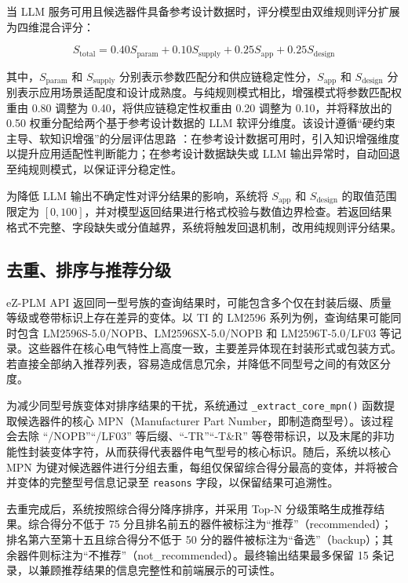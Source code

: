 当 LLM 服务可用且候选器件具备参考设计数据时，评分模型由双维规则评分扩展为四维混合评分：

\begin{equation}
S_{\text{total}} = 0.40 S_{\text{param}} + 0.10 S_{\text{supply}} + 0.25 S_{\text{app}} + 0.25 S_{\text{design}}
\label{eq:hybrid}
\end{equation}

其中，$S_{\text{param}}$ 和 $S_{\text{supply}}$ 分别表示参数匹配分和供应链稳定性分，$S_{\text{app}}$ 和 $S_{\text{design}}$ 分别表示应用场景适配度和设计成熟度。与纯规则模式相比，增强模式将参数匹配权重由 0.80 调整为 0.40，将供应链稳定性权重由 0.20 调整为 0.10，并将释放出的 0.50 权重分配给两个基于参考设计数据的 LLM 软评分维度。该设计遵循“硬约束主导、软知识增强”的分层评估思路 \cite{wang2022selection}：在参考设计数据可用时，引入知识增强维度以提升应用适配性判断能力；在参考设计数据缺失或 LLM 输出异常时，自动回退至纯规则模式，以保证评分稳定性。

为降低 LLM 输出不确定性对评分结果的影响，系统将 $S_{\text{app}}$ 和 $S_{\text{design}}$ 的取值范围限定为 $[0,100]$，并对模型返回结果进行格式校验与数值边界检查。若返回结果格式不完整、字段缺失或分值越界，系统将触发回退机制，改用纯规则评分结果。

\subsection{去重、排序与推荐分级}
eZ-PLM API 返回同一型号族的查询结果时，可能包含多个仅在封装后缀、质量等级或卷带标识上存在差异的变体。以 TI 的 LM2596 系列为例，查询结果可能同时包含 LM2596S-5.0/NOPB、LM2596SX-5.0/NOPB 和 LM2596T-5.0/LF03 等记录。这些器件在核心电气特性上高度一致，主要差异体现在封装形式或包装方式。若直接全部纳入推荐列表，容易造成信息冗余，并降低不同型号之间的有效区分度。

为减少同型号族变体对排序结果的干扰，系统通过 \texttt{\_extract\_core\_mpn()} 函数提取候选器件的核心 MPN（Manufacturer Part Number，即制造商型号）。该过程会去除 “/NOPB”“/LF03” 等后缀、“-TR”“-T\&R” 等卷带标识，以及末尾的非功能性封装变体字符，从而获得代表器件电气型号的核心标识。随后，系统以核心 MPN 为键对候选器件进行分组去重，每组仅保留综合得分最高的变体，并将被合并变体的完整型号信息记录至 \texttt{reasons} 字段，以保留结果可追溯性。

去重完成后，系统按照综合得分降序排序，并采用 Top-N 分级策略生成推荐结果。综合得分不低于 75 分且排名前五的器件被标注为“推荐”（recommended）；排名第六至第十五且综合得分不低于 50 分的器件被标注为“备选”（backup）；其余器件则标注为“不推荐”（not\_recommended）。最终输出结果最多保留 15 条记录，以兼顾推荐结果的信息完整性和前端展示的可读性。

